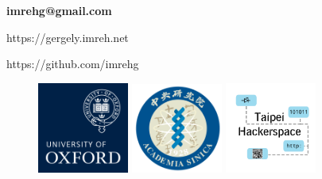 \documentclass{beamer}
\begin{document}
\begin{frame}[fragile]


\textbf{imrehg@gmail.com}

https://gergely.imreh.net

https://github.com/imrehg

\begin{figure}[ht]
	\includegraphics[width=3cm]{Oxford_Logo.png}
	\includegraphics[width=3cm]{Sinica_Logo.png}
	\includegraphics[width=3cm]{Hackerspace_Logo.png}
\end{figure}


\end{frame}
\end{document}
